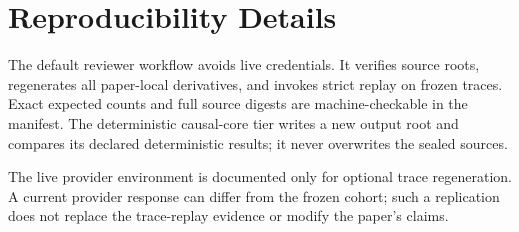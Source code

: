 \section{Reproducibility Details}

The default reviewer workflow avoids live credentials. It verifies source roots, regenerates all paper-local derivatives, and invokes strict replay on frozen traces. Exact expected counts and full source digests are machine-checkable in the \TCOPArtifactDescription{} manifest. The deterministic causal-core tier writes a new output root and compares its declared deterministic results; it never overwrites the sealed sources.

The live provider environment is documented only for optional trace regeneration. A current provider response can differ from the frozen cohort; such a replication does not replace the trace-replay evidence or modify the paper's claims.
